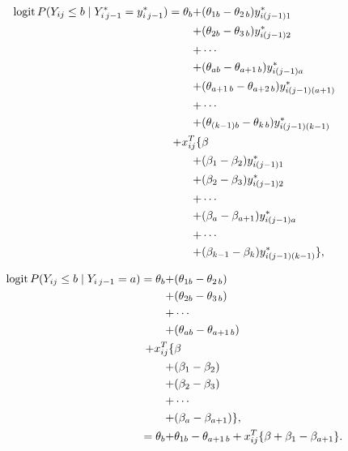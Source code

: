 \documentclass[UTF8,a4paper,10pt]{article}
\begin{document}
\begin{align*}
  \operatorname{logit} P(Y_{ij}\leq b\mid Y_{i\,j-1}^* = y_{i\,j-1}^*) 
  = \theta_b + & (\theta_{1b}-\theta_{2\,b})y_{i(j-1)1}^*\\
  +&(\theta_{2b}-\theta_{3\,b})y_{i(j-1)2}^*\\
  +&\cdots\\
  +&(\theta_{ab}-\theta_{a+1\,b})y_{i(j-1)a}^*\\
  +&(\theta_{a+1\,b}-\theta_{a+2\,b})y_{i(j-1)(a+1)}^*\\
  +&\cdots\\
  +&(\theta_{(k-1)b}-\theta_{k\,b})y_{i(j-1)(k-1)}^*\\
  +x_{ij}^T\{
    &\beta \\
  +&(\beta_{1}-\beta_{2})y_{i(j-1)1}^*\\
  +&(\beta_{2}-\beta_{3})y_{i(j-1)2}^*\\
  +&\cdots\\
  +&(\beta_{a}-\beta_{a+1})y_{i(j-1)a}^*\\
  +&\cdots\\
  +&(\beta_{k-1}-\beta_{k})y_{i(j-1)(k-1)}^*\},\\
\end{align*}


\begin{align*}
  \operatorname{logit} P(Y_{ij}\leq b\mid Y_{i \, j-1} = a) 
  = \theta_b + & (\theta_{1b}-\theta_{2\,b})\\
  +&(\theta_{2b}-\theta_{3\,b})\\
  +&\cdots\\
  +&(\theta_{ab}-\theta_{a+1\,b})\\
  +x_{ij}^T\{
    &\beta \\
  +&(\beta_{1}-\beta_{2})\\
  +&(\beta_{2}-\beta_{3})\\
  +&\cdots\\
  +&(\beta_{a}-\beta_{a+1}) \},\\
  = \theta_b + & \theta_{1b} - \theta_{a+1\,b} + x_{ij}^T\{ \beta + \beta_{1} -\beta_{a+1} \}.
\end{align*}

\pagebreak
\end{document}
